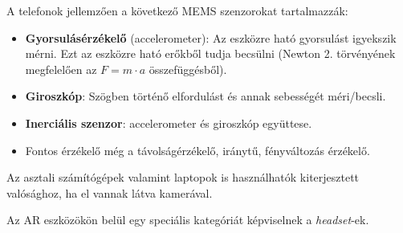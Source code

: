 A telefonok jellemzően a következő MEMS szenzorokat tartalmazzák:
\begin{itemize}

\item {\bf Gyorsulásérzékelő} (accelerometer): Az eszközre ható gyorsulást igyekszik mérni. Ezt az eszközre ható erőkből tudja becsülni (Newton 2. törvényének megfelelően az $F = m \cdot a$ összefüggésből).
\item {\bf Giroszkóp}: Szögben történő elfordulást és annak sebességét méri/becsli.
\item {\bf Inerciális szenzor}: accelerometer és giroszkóp együttese.
\item Fontos érzékelő még a távolságérzékelő, iránytű, fényváltozás érzékelő.
\end{itemize}

Az asztali számítógépek valamint laptopok is használhatók kiterjesztett valósághoz, ha el vannak látva kamerával.


Az AR eszközökön belül egy speciális kategóriát képviselnek a \textit{headset}-ek.

